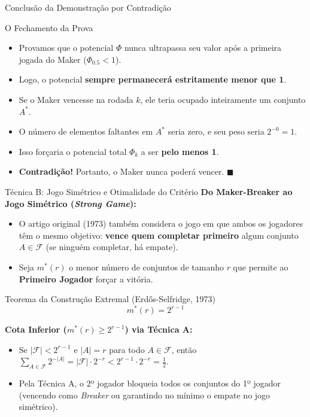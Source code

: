 \documentclass[11pt, aspectratio=169]{beamer}
\begin{document}
\begin{frame}{Conclusão da Demonstração por Contradição}
    \begin{block}{O Fechamento da Prova}
        \begin{itemize}
            \item Provamos que o potencial $\Phi$ nunca ultrapassa seu valor após a primeira jogada do Maker ($\Phi_{0.5} < 1$).
            \item Logo, o potencial \textbf{sempre permanecerá estritamente menor que 1}.
            \item Se o Maker vencesse na rodada $k$, ele teria ocupado inteiramente um conjunto $A^*$.
            \item O número de elementos faltantes em $A^*$ seria zero, e seu peso seria $2^{-0} = 1$.
            \item Isso forçaria o potencial total $\Phi_k$ a ser \textbf{pelo menos 1}.
            \item \textbf{Contradição!} Portanto, o Maker nunca poderá vencer. $\blacksquare$
        \end{itemize}
    \end{block}
\end{frame}

\begin{frame}{Técnica B: Jogo Simétrico e Otimalidade do Critério}
    \small
    \textbf{Do Maker-Breaker ao Jogo Simétrico (\textit{Strong Game}):}
    \begin{itemize}
        \item O artigo original (1973) também considera o jogo em que ambos os jogadores têm o mesmo objetivo: \textbf{vence quem completar primeiro} algum conjunto $A \in \mathcal{F}$ (se ninguém completar, há empate).
        \item Seja $m^*(r)$ o menor número de conjuntos de tamanho $r$ que permite ao \textbf{Primeiro Jogador} forçar a vitória.
    \end{itemize}

    \begin{block}{Teorema da Construção Extremal (Erdős-Selfridge, 1973)}
        $$m^*(r) = 2^{r-1}$$
    \end{block}

    \textbf{Cota Inferior ($m^*(r) \ge 2^{r-1}$) via Técnica A:}
    \begin{itemize}
        \item Se $|\mathcal{F}| < 2^{r-1}$ e $|A| = r$ para todo $A \in \mathcal{F}$, então $\sum_{A \in \mathcal{F}} 2^{-|A|} = |\mathcal{F}| \cdot 2^{-r} < 2^{r-1} \cdot 2^{-r} = \tfrac{1}{2}$.
        \item Pela Técnica A, o 2º jogador bloqueia todos os conjuntos do 1º jogador (vencendo como \textit{Breaker} ou garantindo no mínimo o empate no jogo simétrico).
    \end{itemize}
\end{frame}
\end{document}
